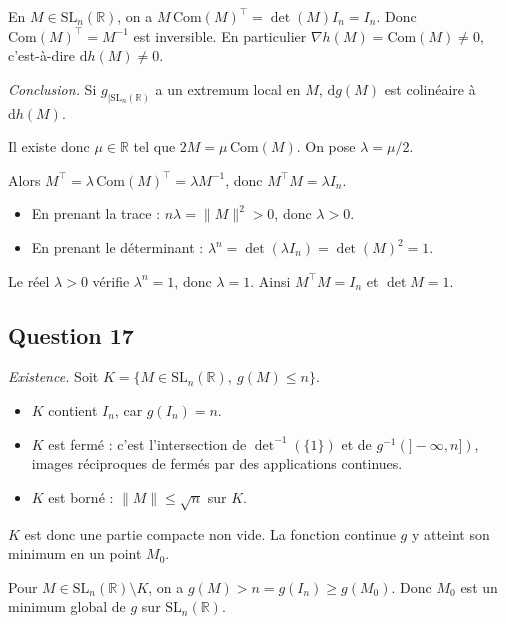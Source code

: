 \documentclass[11pt,a4paper]{article}
\providecommand{\tightlist}{\setlength{\itemsep}{0pt}\setlength{\parskip}{0pt}}
\newcommand{\equationajustee}[1]{%
  \sbox{\boiteequation}{$\displaystyle #1$}%
  \ifdim\wd\boiteequation>\linewidth
    \[\resizebox{\linewidth}{!}{\usebox{\boiteequation}}\]%
  \else
    \[#1\]%
  \fi}
\begin{document}
En \(M\in{\mathrm{SL}}_n(\mathbb R)\), on a \(M\,\mathrm{Com}(M)^\top=\det(M)I_n=I_n\). Donc \(\mathrm{Com}(M)^\top=M^{-1}\) est inversible. En particulier \(\nabla h(M)=\mathrm{Com}(M)\ne0\), c'est-à-dire \(\mathrm dh(M)\ne0\).

\emph{Conclusion.} Si \(g_{|{\mathrm{SL}}_n(\mathbb R)}\) a un extremum local en \(M\), \(\mathrm dg(M)\) est colinéaire à \(\mathrm dh(M)\).

Il existe donc \(\mu\in\mathbb R\) tel que \(2M=\mu\,\mathrm{Com}(M)\). On pose \(\lambda=\mu/2\).

\equationajustee{\boxed{\exists\lambda\in\mathbb R,\quad M=\lambda\,\mathrm{Com}(M).}}

Alors \(M^\top=\lambda\,\mathrm{Com}(M)^\top=\lambda M^{-1}\), donc \(M^\top M=\lambda I_n\).

\begin{itemize}
\tightlist
\item
  En prenant la trace : \(n\lambda=\|M\|^2>0\), donc \(\lambda>0\).
\item
  En prenant le déterminant : \(\lambda^n=\det(\lambda I_n)=\det(M)^2=1\).
\end{itemize}

Le réel \(\lambda>0\) vérifie \(\lambda^n=1\), donc \(\lambda=1\). Ainsi \(M^\top M=I_n\) et \(\det M=1\).

\equationajustee{\boxed{M\in{\mathrm{SO}}_n(\mathbb R)}}

\hypertarget{question-17}{%
\subsection{Question 17}\label{question-17}}

\emph{Existence.} Soit \(K=\{M\in{\mathrm{SL}}_n(\mathbb R),\ g(M)\le n\}\).

\begin{itemize}
\tightlist
\item
  \(K\) contient \(I_n\), car \(g(I_n)=n\).
\item
  \(K\) est fermé : c'est l'intersection de \(\det^{-1}(\{1\})\) et de \(g^{-1}(]-\infty,n])\), images réciproques de fermés par des applications continues.
\item
  \(K\) est borné : \(\|M\|\le\sqrt n\) sur \(K\).
\end{itemize}

\(K\) est donc une partie compacte non vide. La fonction continue \(g\) y atteint son minimum en un point \(M_0\).

Pour \(M\in{\mathrm{SL}}_n(\mathbb R)\setminus K\), on a \(g(M)>n=g(I_n)\ge g(M_0)\). Donc \(M_0\) est un minimum global de \(g\) sur \({\mathrm{SL}}_n(\mathbb R)\).
\end{document}
